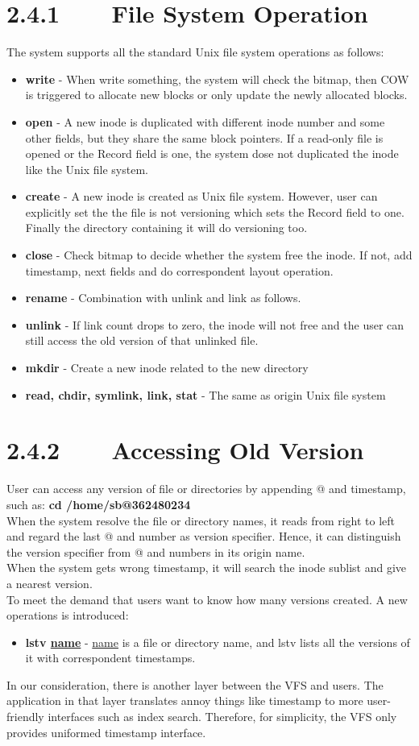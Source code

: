 \section*{2.4.1~~~~File System Operation}
The system supports all the standard Unix file system operations as follows:
\begin{itemize}
\item \textbf{write} - When write something, the system will check the bitmap, then COW is triggered to allocate new blocks or only update the newly allocated blocks.
\item \textbf{open} - A new inode is duplicated with different inode number and some other fields, but they share the same block pointers. If a read-only file is opened or the Record field is one, the system dose not duplicated the inode like the Unix file system.
\item \textbf{create} - A new inode is created as Unix file system. However, user can explicitly set the the file is not versioning which sets the Record field to one. Finally the directory containing it will do versioning too.
\item \textbf{close} - Check bitmap to decide whether the system free the inode. If not, add timestamp, next fields and do correspondent layout operation.
\item \textbf{rename} - Combination with unlink and link as follows.
\item \textbf{unlink} - If link count drops to zero, the inode will not free and the user can still access the old version of that unlinked file.
\item \textbf{mkdir} - Create a new inode related to the new directory
\item \textbf{read, chdir, symlink, link, stat} - The same as origin Unix file system
\end{itemize}
\section*{2.4.2~~~~Accessing Old Version}
User can access any version of file or directories by appending @ and timestamp, such as:  \textbf{cd /home/sb@362480234}\\[1em]When the system resolve the file or directory names, it reads from right to left and regard the last @ and number as version specifier. Hence, it can distinguish the version specifier from @ and numbers in its origin name.\\[1em]
When the system gets wrong timestamp, it will search the inode sublist and give a nearest version.\\[1em]
To meet the demand that users want to know how many versions created. A new operations is  introduced:
\begin{itemize}
\item \textbf{lstv \underline{name}} - \underline{name} is a file or directory name, and lstv lists all the versions of it with correspondent timestamps.
\end{itemize}
In our consideration, there is another layer between the VFS and users. The application in that layer translates annoy things like timestamp to more user-friendly interfaces such as index search. Therefore, for simplicity, the VFS only provides uniformed timestamp interface.
